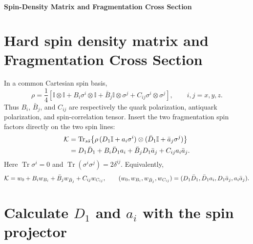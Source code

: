 \documentclass[10pt]{article}
\newcommand{\Tr}{\operatorname{Tr}}
\newcommand{\id}{\mathbb{I}}
\begin{document}
\begin{center}
{\Large\bfseries Spin-Density Matrix and Fragmentation Cross Section}
\end{center}
\vspace{0.25em}
\small

\section{Hard spin density matrix and Fragmentation Cross Section}

In a common Cartesian spin basis,
\[
\rho=\frac14\left[
\id\otimes\id+B_i\sigma^i\otimes\id
+\bar B_j\id\otimes\sigma^j
+C_{ij}\sigma^i\otimes\sigma^j\right],
\qquad i,j=x,y,z .
\]
Thus \(B_i\), \(\bar B_j\), and \(C_{ij}\) are respectively the quark
polarization, antiquark polarization, and spin-correlation tensor. Insert the two fragmentation spin factors directly on the two spin lines:
\begin{align*}
{\cal K}
&=\Tr_{s\bar s}\!\left\{\rho\,
(D_1\id+a_i\sigma^i)\otimes
(\bar D_1\id+\bar a_j\sigma^j)\right\}
\\
&=D_1\bar D_1+B_i\bar D_1a_i
+\bar B_jD_1\bar a_j+C_{ij}a_i\bar a_j .
\end{align*}
Here \(\Tr\sigma^i=0\) and
\(\Tr(\sigma^i\sigma^j)=2\delta^{ij}\).
Equivalently,
\[
{\cal K}=w_0+B_iw_{B_i}+\bar B_jw_{\bar B_j}+C_{ij}w_{C_{ij}},
\qquad
(w_0,w_{B_i},w_{\bar B_j},w_{C_{ij}})
=(D_1\bar D_1,\bar D_1a_i,D_1\bar a_j,a_i\bar a_j).
\]

\section{Calculate \(D_1\) and \(a_i\) with the spin projector}
\end{document}
